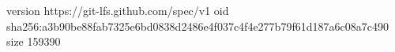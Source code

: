 version https://git-lfs.github.com/spec/v1
oid sha256:a3b90be88fab7325e6bd0838d2486e4f037c4f4e277b79f61d187a6c08a7c490
size 159390

